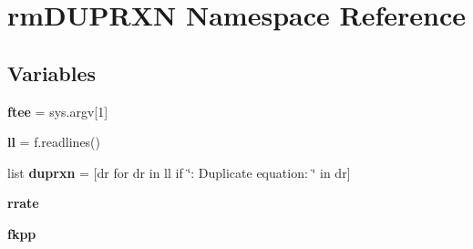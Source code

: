 \hypertarget{namespacermDUPRXN}{}\section{rm\+D\+U\+P\+R\+XN Namespace Reference}
\label{namespacermDUPRXN}
\subsection*{Variables}
\begin{DoxyCompactItemize}
\item 
\mbox{\label{namespacermDUPRXN_a2cb0e530af69453ad02098e725e7c97e}} 
{\bfseries ftee} = sys.\+argv\mbox{[}1\mbox{]}
\item 
\mbox{\label{namespacermDUPRXN_a68cdb9966d2298ce9e65ff119450ba43}} 
{\bfseries ll} = f.\+readlines()
\item 
\mbox{\label{namespacermDUPRXN_a72d5febaa62b413251cf2b591e3bdd92}} 
list {\bfseries duprxn} = \mbox{[}dr for dr in ll if \char`\"{}\+: Duplicate equation\+: \char`\"{} in dr\mbox{]}
\item 
\mbox{\label{namespacermDUPRXN_a9a7518a0eb5b496f4ba1f036a403ffb9}} 
{\bfseries rrate}
\item 
\mbox{\label{namespacermDUPRXN_a2d48c4ffeeb3bdffa232e4fd6bf99342}} 
{\bfseries fkpp}
\end{DoxyCompactItemize}


